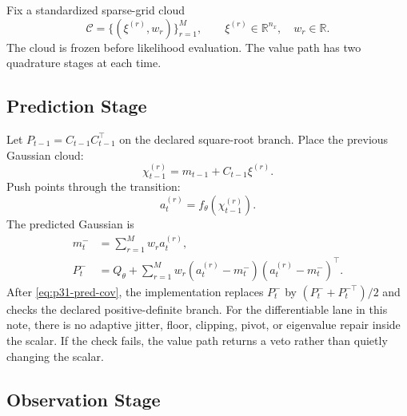 \documentclass[11pt]{article}
\numberwithin{equation}{section}
\newcommand{\R}{\mathbb R}
\begin{document}
Fix a standardized sparse-grid cloud
\begin{equation}
  \mathcal C=\{(\xi^{(r)},w_r)\}_{r=1}^M,
  \qquad
  \xi^{(r)}\in\R^{n_x},
  \quad
  w_r\in\R.
  \label{eq:p31-cloud-for-filter}
\end{equation}
The cloud is frozen before likelihood evaluation.  The value path has two
quadrature stages at each time.

\subsection{Prediction Stage}

Let \(P_{t-1}=C_{t-1}C_{t-1}^\top\) on the declared square-root branch.  Place
the previous Gaussian cloud:
\begin{equation}
  \chi_{t-1}^{(r)}
  =
  m_{t-1}+C_{t-1}\xi^{(r)}.
  \label{eq:p31-pred-placed-points}
\end{equation}
Push points through the transition:
\begin{equation}
  a_t^{(r)}=f_\theta(\chi_{t-1}^{(r)}).
  \label{eq:p31-transition-points}
\end{equation}
The predicted Gaussian is
\begin{align}
  m_t^-&=\sum_{r=1}^Mw_ra_t^{(r)},
  \label{eq:p31-pred-mean}\\
  P_t^-&=Q_\theta+\sum_{r=1}^Mw_r
  (a_t^{(r)}-m_t^-)(a_t^{(r)}-m_t^-)^\top.
  \label{eq:p31-pred-cov}
\end{align}
After \eqref{eq:p31-pred-cov}, the implementation replaces \(P_t^-\) by
\((P_t^-+P_t^{-\top})/2\) and checks the declared positive-definite branch.
For the differentiable lane in this note, there is no adaptive jitter, floor,
clipping, pivot, or eigenvalue repair inside the scalar.  If the check fails,
the value path returns a veto rather than quietly changing the scalar.

\subsection{Observation Stage}
\end{document}
